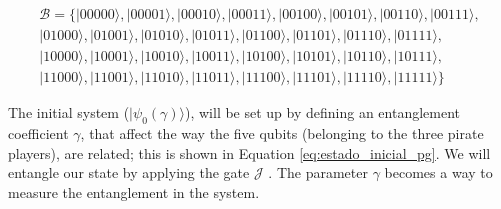 \begin{equation}
\begin{split}
\mathcal{B}= \{ \vert 00000\rangle , \vert 00001\rangle , \vert 00010\rangle , \vert 00011\rangle , \vert 00100\rangle , \vert 00101\rangle , \vert 00110\rangle , \vert 00111\rangle, \\
 \vert 01000\rangle , \vert 01001\rangle , \vert 01010\rangle , \vert 01011\rangle , \vert 01100\rangle , \vert 01101\rangle , \vert 01110\rangle , \vert 01111\rangle, \\
 \vert 10000\rangle , \vert 10001\rangle , \vert 10010\rangle , \vert 10011\rangle , \vert 10100\rangle , \vert 10101\rangle , \vert 10110\rangle , \vert 10111\rangle, \\
 \vert 11000\rangle , \vert 11001\rangle , \vert 11010\rangle , \vert 11011\rangle , \vert 11100\rangle , \vert 11101\rangle , \vert 11110\rangle , \vert 11111\rangle \}
\end{split}
\label{putadevida}
\end{equation}

The initial system ($\vert \psi_{0}(\gamma) \rangle$), will be set up by defining an entanglement coefficient $\gamma$, that affect the way the five qubits (belonging to the three pirate players), are related; this is shown in Equation \ref{eq:estado_inicial_pg}. 
We will entangle our state by applying the gate $\mathcal{J}$ \cite{Letters2002}. The parameter $\gamma$ becomes a way to measure the entanglement in the system\cite{Eisert2008}. 

